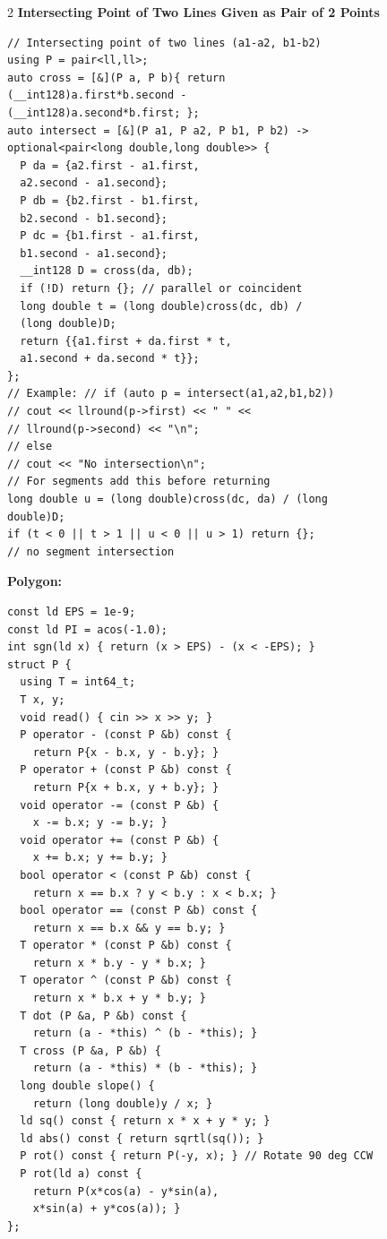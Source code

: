 \documentclass[10pt,a4paper]{article}
\begin{document}
\begin{paracol}{2}
\textbf{Intersecting Point of Two Lines Given as Pair of 2 Points}
\begin{lstlisting}
// Intersecting point of two lines (a1-a2, b1-b2)
using P = pair<ll,ll>;
auto cross = [&](P a, P b){ return
(__int128)a.first*b.second -
(__int128)a.second*b.first; };
auto intersect = [&](P a1, P a2, P b1, P b2) ->
optional<pair<long double,long double>> {
  P da = {a2.first - a1.first,
  a2.second - a1.second};
  P db = {b2.first - b1.first,
  b2.second - b1.second};
  P dc = {b1.first - a1.first,
  b1.second - a1.second};
  __int128 D = cross(da, db);
  if (!D) return {}; // parallel or coincident
  long double t = (long double)cross(dc, db) /
  (long double)D;
  return {{a1.first + da.first * t,
  a1.second + da.second * t}};
};
// Example: // if (auto p = intersect(a1,a2,b1,b2))
// cout << llround(p->first) << " " <<
// llround(p->second) << "\n";
// else
// cout << "No intersection\n";
// For segments add this before returning
long double u = (long double)cross(dc, da) / (long
double)D;
if (t < 0 || t > 1 || u < 0 || u > 1) return {};
// no segment intersection
\end{lstlisting}

\textbf{Polygon:}
\begin{lstlisting}
const ld EPS = 1e-9;
const ld PI = acos(-1.0);
int sgn(ld x) { return (x > EPS) - (x < -EPS); }
struct P {
  using T = int64_t;
  T x, y;
  void read() { cin >> x >> y; }
  P operator - (const P &b) const {
    return P{x - b.x, y - b.y}; }
  P operator + (const P &b) const {
    return P{x + b.x, y + b.y}; }
  void operator -= (const P &b) {
    x -= b.x; y -= b.y; }
  void operator += (const P &b) {
    x += b.x; y += b.y; }
  bool operator < (const P &b) const {
    return x == b.x ? y < b.y : x < b.x; }
  bool operator == (const P &b) const {
    return x == b.x && y == b.y; }
  T operator * (const P &b) const {
    return x * b.y - y * b.x; }
  T operator ^ (const P &b) const {
    return x * b.x + y * b.y; }
  T dot (P &a, P &b) const {
    return (a - *this) ^ (b - *this); }
  T cross (P &a, P &b) {
    return (a - *this) * (b - *this); }
  long double slope() {
    return (long double)y / x; }
  ld sq() const { return x * x + y * y; }
  ld abs() const { return sqrtl(sq()); }
  P rot() const { return P(-y, x); } // Rotate 90 deg CCW
  P rot(ld a) const {
    return P(x*cos(a) - y*sin(a),
    x*sin(a) + y*cos(a)); }
};
\end{lstlisting}


\end{paracol}
\end{document}
